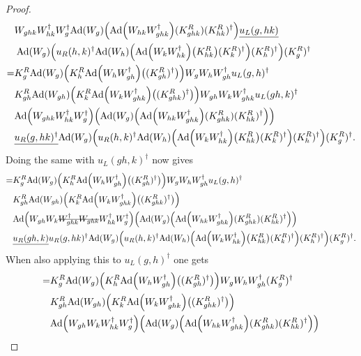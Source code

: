\documentclass[11pt,a4paper,twoside]{article}
\numberwithin{equation}{section}
\begin{document}
\begin{proof}
\begin{align}
			\nonumber
			&W_{ghk}W_{hk}^\dagger W_{g}^\dagger \Ad{W_g}\left( \Ad{W_{hk}W_{ghk}^\dagger}(K^R_{ghk})(K^R_{hk})^{\dagger} \right)\underline{u_L(g,hk)}\\
			\nonumber
			&\:\Ad{W_g}\left(u_R(h,k)^\dagger \Ad{W_h}\left(\Ad{W_kW_{hk}^\dagger}\left(K_{hk}^R\right)(K^R_k)^\dagger\right)(K^R_h)^\dagger\right)(K^R_g)^\dagger\\
			=&K_g^R\Ad{W_g}\left(K_h^R\Ad{W_hW_{gh}^\dagger}\left((K_{gh}^R)^\dagger\right)\right)W_gW_hW_{gh}^\dagger u_L(g,h)^\dagger\\
			\nonumber
			&K_{gh}^R\Ad{W_{gh}}\left(K_k^R\Ad{W_kW_{ghk}^\dagger}\left((K_{ghk}^R)^\dagger\right)\right) W_{gh}W_kW_{ghk}^\dagger u_L(gh,k)^\dagger\\
			\nonumber
			&\Ad{W_{ghk}W_{hk}^\dagger W_{g}^\dagger}  \left(\Ad{W_g}\left( \Ad{W_{hk}W_{ghk}^\dagger}(K^R_{ghk})(K^R_{hk})^{\dagger} \right)\right)\\
			\nonumber
			&\underline{u_R(g,hk)^\dagger}\Ad{W_g}\left(u_R(h,k)^\dagger \Ad{W_h}\left(\Ad{W_kW_{hk}^\dagger}\left(K_{hk}^R\right)(K^R_k)^\dagger\right)(K^R_h)^\dagger\right)(K^R_g)^\dagger.
		\end{align}
		Doing the same with $u_L(gh,k)^\dagger$ now gives
		\begin{align}
			=&K_g^R\Ad{W_g}\left(K_h^R\Ad{W_hW_{gh}^\dagger}\left((K_{gh}^R)^\dagger\right)\right)W_gW_hW_{gh}^\dagger u_L(g,h)^\dagger\\
			\nonumber
			&K_{gh}^R\Ad{W_{gh}}\left(K_k^R\Ad{W_kW_{ghk}^\dagger}\left((K_{ghk}^R)^\dagger\right)\right)  \\
			\nonumber
			&\Ad{W_{gh}W_k\stkout{W_{ghk}^\dagger W_{ghk}}W_{hk}^\dagger W_{g}^\dagger}  \left(\Ad{W_g}\left( \Ad{W_{hk}W_{ghk}^\dagger}(K^R_{ghk})(K^R_{hk})^{\dagger} \right)\right)\\
			\nonumber
			&\underline{u_R(gh,k)}u_R(g,hk)^\dagger\Ad{W_g}\left(u_R(h,k)^\dagger \Ad{W_h}\left(\Ad{W_kW_{hk}^\dagger}\left(K_{hk}^R\right)(K^R_k)^\dagger\right)(K^R_h)^\dagger\right)(K^R_g)^\dagger.
		\end{align}
		When also applying this to $u_L(g,h)^\dagger$ one gets
		\begin{align}
			=&K_g^R\Ad{W_g}\left(K_h^R\Ad{W_hW_{gh}^\dagger}\left((K_{gh}^R)^\dagger\right)\right)W_gW_hW_{gh}^\dagger (K^R_g)^\dagger\\
			\nonumber
			&K_{gh}^R\Ad{W_{gh}}\left(K_k^R\Ad{W_kW_{ghk}^\dagger}\left((K_{ghk}^R)^\dagger\right)\right)\\
			\nonumber
			&\Ad{W_{gh}W_kW_{hk}^\dagger W_{g}^\dagger}  \left(\Ad{W_g}\left( \Ad{W_{hk}W_{ghk}^\dagger}(K^R_{ghk})(K^R_{hk})^{\dagger} \right)\right)\\

\end{align}
\end{proof}
\end{document}
